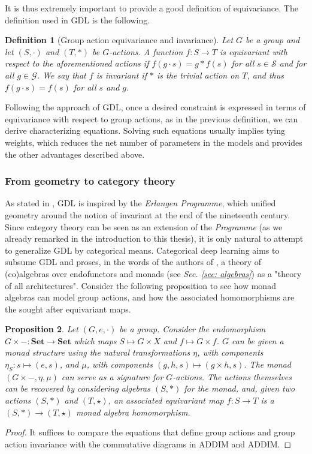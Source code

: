 \documentclass[12pt,a4paper,openright,twoside]{report}
\theoremstyle{plain}
\newtheorem{proposition}{Proposition}
\newtheorem{definition}[proposition]{Definition}
\theoremstyle{definition}
\begin{document}
It is thus extremely important to provide a good definition of equivariance. The definition used in GDL is the following.


\begin{definition}[Group action equivariance and invariance]
  Let $G$ be a group and let $(S, \cdot)$ and $(T, \ast)$ be $G$-actions. A function $f: S \to T$ is equivariant with respect to the aforementioned actions if $f(g \cdot s) = g \ast f(s)$ for all $s \in \mathcal{S}$ and for all $g \in \mathcal{G}$. We say that $f$ is invariant if $\ast$ is the trivial action on $T$, and thus $f(g \cdot s) = f(s)$ for all $s$ and $g$.
\end{definition}


Following the approach of GDL, once a desired constraint is expressed in terms of equivariance with respect to group actions, as in the previous definition, we can derive characterizing equations. Solving such equations usually implies tying weights, which reduces the net number of parameters in the models and provides the other advantages described above.


\subsubsection{From geometry to category theory}


As stated in \cite{bronstein2021geometric}, GDL is inspired by the \textit{Erlangen Programme}, which unified geometry around the notion of invariant at the end of the nineteenth century. Since category theory can be seen as an extension of the \textit{Programme} (as we already remarked in the introduction to this thesis), it is only natural to attempt to generalize GDL by categorical means. Categorical deep learning aims to subsume GDL and proses, in the words of the authors of \cite{gavranovicposition}, a theory of (co)algebras over endofunctors and monads (see \textit{Sec. \ref{sec: algebras}}) as a "theory of all architectures". Consider the following proposition to see how monad algebras can model group actions, and how the associated homomorphisms are the sought after equivariant maps.

\begin{proposition}
  Let $(G,e,\cdot)$ be a group. Consider the endomorphism $G \times -: \mathbf{Set} \to \mathbf{Set}$ which maps $S \mapsto G \times X$ and $f \mapsto G \times f$. $G$ can be given a monad structure using the natural transformations $\eta$, with components $\eta_S: s \mapsto (e,s)$, and $\mu$, with components $(g,h,s) \mapsto (g \times h, s)$. 
  The monad $(G \times -, \eta, \mu)$ can serve as a signature for $G$-actions. The actions themselves can be recovered by considering algebras $(S,\ast)$ for the monad, and, given two actions $(S,\ast)$ and $(T,\star)$, an associated equivariant map $f: S \to T$ is a $(S,\ast) \to (T,\star)$ monad algebra homomorphism.
\end{proposition}
\begin{proof}
  It suffices to compare the equations that define group actions and group action invariance with the commutative diagrams in ADDIM and ADDIM.
\end{proof}
\end{document}

